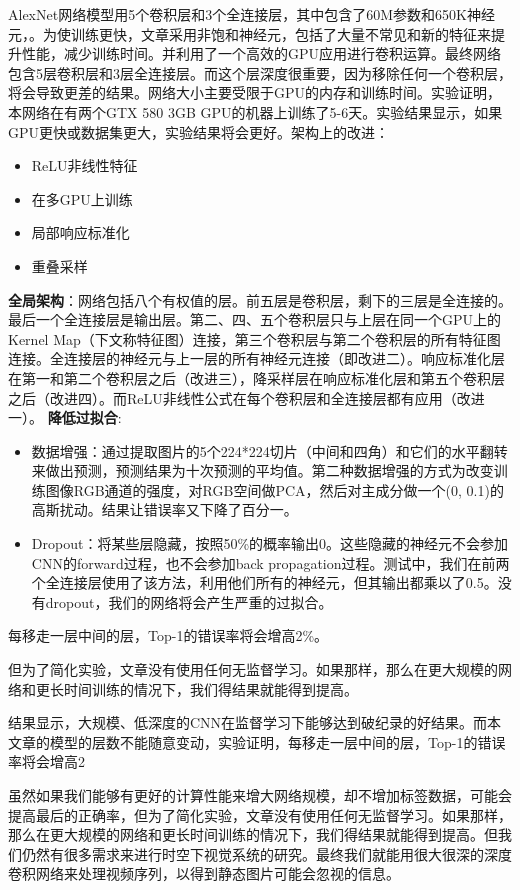 \documentclass[12pt]{article}
\begin{document}
AlexNet网络模型用5个卷积层和3个全连接层，其中包含了60M参数和650K神经元，。为使训练更快，文章采用非饱和神经元，包括了大量不常见和新的特征来提升性能，减少训练时间。并利用了一个高效的GPU应用进行卷积运算。最终网络包含5层卷积层和3层全连接层。而这个层深度很重要，因为移除任何一个卷积层，将会导致更差的结果。网络大小主要受限于GPU的内存和训练时间。实验证明，本网络在有两个GTX 580 3GB GPU的机器上训练了5-6天。实验结果显示，如果GPU更快或数据集更大，实验结果将会更好。架构上的改进：
	\begin{itemize}
	\item ReLU非线性特征 
	\item 在多GPU上训练
	\item 局部响应标准化
	\item 重叠采样
	\end{itemize}
\textbf{全局架构}：网络包括八个有权值的层。前五层是卷积层，剩下的三层是全连接的。最后一个全连接层是输出层。第二、四、五个卷积层只与上层在同一个GPU上的Kernel Map（下文称特征图）连接，第三个卷积层与第二个卷积层的所有特征图连接。全连接层的神经元与上一层的所有神经元连接（即改进二）。响应标准化层在第一和第二个卷积层之后（改进三），降采样层在响应标准化层和第五个卷积层之后（改进四）。而ReLU非线性公式在每个卷积层和全连接层都有应用（改进一）。
\textbf{降低过拟合}:
\begin{itemize}
\item 数据增强：通过提取图片的5个224*224切片（中间和四角）和它们的水平翻转来做出预测，预测结果为十次预测的平均值。第二种数据增强的方式为改变训练图像RGB通道的强度，对RGB空间做PCA，然后对主成分做一个(0, 0.1)的高斯扰动。结果让错误率又下降了百分一。

\item Dropout：将某些层隐藏，按照50\%的概率输出0。这些隐藏的神经元不会参加CNN的forward过程，也不会参加back propagation过程。测试中，我们在前两个全连接层使用了该方法，利用他们所有的神经元，但其输出都乘以了0.5。没有dropout，我们的网络将会产生严重的过拟合。
\end{itemize}

每移走一层中间的层，Top-1的错误率将会增高2\%。

但为了简化实验，文章没有使用任何无监督学习。如果那样，那么在更大规模的网络和更长时间训练的情况下，我们得结果就能得到提高。

结果显示，大规模、低深度的CNN在监督学习下能够达到破纪录的好结果。而本文章的模型的层数不能随意变动，实验证明，每移走一层中间的层，Top-1的错误率将会增高2%

虽然如果我们能够有更好的计算性能来增大网络规模，却不增加标签数据，可能会提高最后的正确率，但为了简化实验，文章没有使用任何无监督学习。如果那样，那么在更大规模的网络和更长时间训练的情况下，我们得结果就能得到提高。但我们仍然有很多需求来进行时空下视觉系统的研究。最终我们就能用很大很深的深度卷积网络来处理视频序列，以得到静态图片可能会忽视的信息。
\end{document}
